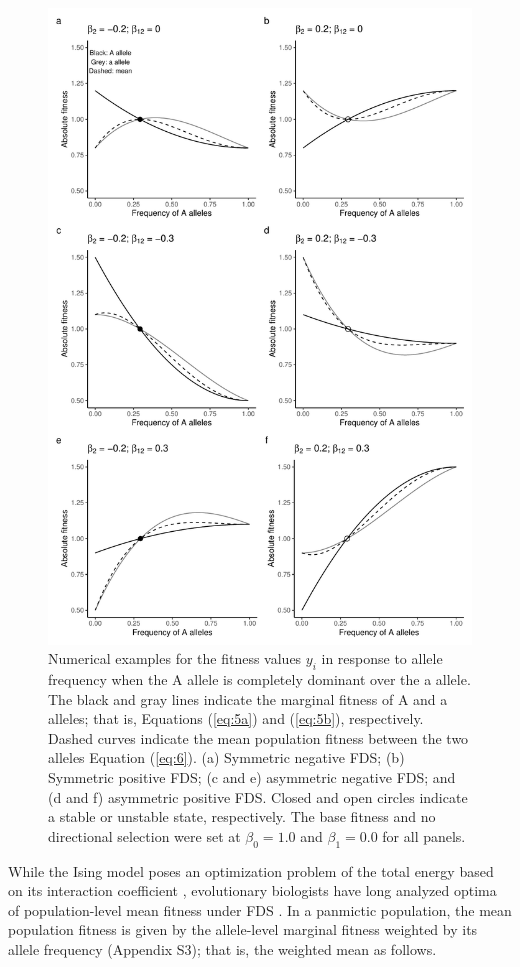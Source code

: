 \documentclass[12pt,]{article}
\begin{document}
\begin{figure}[]
  \includegraphics[width=0.7\linewidth]{AsymFDSdomi.pdf}
  \caption{Numerical examples for the fitness values $y_i$ in response to allele frequency when the A allele is completely dominant over the a allele. The black and gray lines indicate the marginal fitness of A and a alleles; that is, Equations (\ref{eq:5a}) and (\ref{eq:5b}), respectively. Dashed curves indicate the mean population fitness between the two alleles Equation (\ref{eq:6}). (a) Symmetric negative FDS; (b) Symmetric positive FDS; (c and e) asymmetric negative FDS; and (d and f) asymmetric positive FDS. Closed and open circles indicate a stable or unstable state, respectively. The base fitness and no directional selection were set at $\beta_0=1.0$ and $\beta_1=0.0$ for all panels.}
  \label{fig2:asym}
\end{figure}


While the Ising model poses an optimization problem of the total energy based on its interaction coefficient \citep{cipra1987introduction, anderson1991two, prugel1997dynamics}, evolutionary biologists have long analyzed optima of population-level mean fitness under FDS \citep{cockerham1972frequency,schneider_maximization_2008,takahashi2018balanced}. In a panmictic population, the mean population fitness is given by the allele-level marginal fitness weighted by its allele frequency (Appendix S3); that is, the weighted mean as follows.
\end{document}

